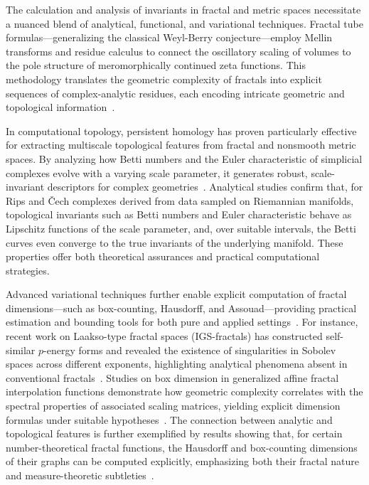 \documentclass[sigconf]{acmart}
\begin{document}
The calculation and analysis of invariants in fractal and metric spaces necessitate a nuanced blend of analytical, functional, and variational techniques. Fractal tube formulas—generalizing the classical Weyl-Berry conjecture—employ Mellin transforms and residue calculus to connect the oscillatory scaling of volumes to the pole structure of meromorphically continued zeta functions. This methodology translates the geometric complexity of fractals into explicit sequences of complex-analytic residues, each encoding intricate geometric and topological information~\cite{ref21,ref33}.

In computational topology, persistent homology has proven particularly effective for extracting multiscale topological features from fractal and nonsmooth metric spaces. By analyzing how Betti numbers and the Euler characteristic of simplicial complexes evolve with a varying scale parameter, it generates robust, scale-invariant descriptors for complex geometries~\cite{ref88}. Analytical studies confirm that, for Rips and \v{C}ech complexes derived from data sampled on Riemannian manifolds, topological invariants such as Betti numbers and Euler characteristic behave as Lipschitz functions of the scale parameter, and, over suitable intervals, the Betti curves even converge to the true invariants of the underlying manifold. These properties offer both theoretical assurances and practical computational strategies.

Advanced variational techniques further enable explicit computation of fractal dimensions—such as box-counting, Hausdorff, and Assouad—providing practical estimation and bounding tools for both pure and applied settings~\cite{ref13,ref43,ref27}. For instance, recent work on Laakso-type fractal spaces (IGS-fractals) has constructed self-similar $p$-energy forms and revealed the existence of singularities in Sobolev spaces across different exponents, highlighting analytical phenomena absent in conventional fractals~\cite{ref13}. Studies on box dimension in generalized affine fractal interpolation functions demonstrate how geometric complexity correlates with the spectral properties of associated scaling matrices, yielding explicit dimension formulas under suitable hypotheses~\cite{ref28}. The connection between analytic and topological features is further exemplified by results showing that, for certain number-theoretical fractal functions, the Hausdorff and box-counting dimensions of their graphs can be computed explicitly, emphasizing both their fractal nature and measure-theoretic subtleties~\cite{ref27}.
\end{document}
